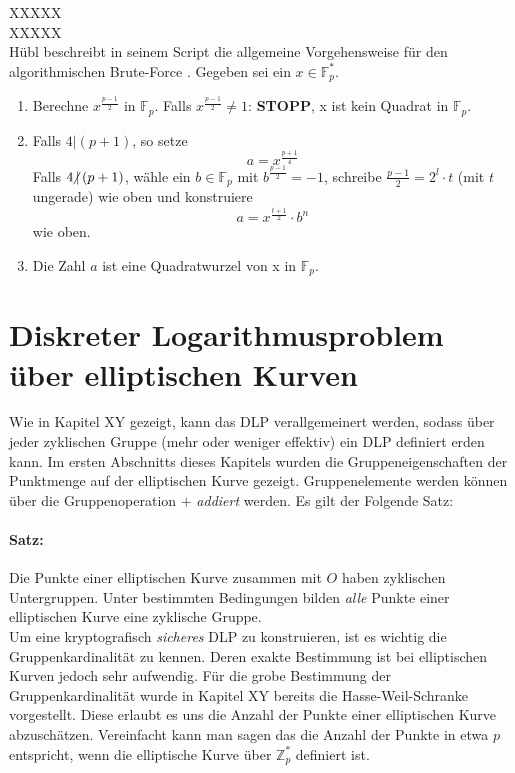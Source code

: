 XXXXX\\

XXXXX\\





Hübl beschreibt in seinem Script die allgemeine Vorgehensweise für den algorithmischen Brute-Force \cite[S. 270-272]{Dr.ReinholdHubl.2022}. Gegeben sei ein $x \in \mathbb{F}_p^*$.

\begin{enumerate}
\item Berechne $x^{\frac{p - 1}{2}}$ in $\mathbb{F}_p$. Falls $x^{\frac{p - 1}{2}} \neq 1$: \textbf{STOPP}, x ist kein Quadrat in $\mathbb{F}_p$.
\item Falls $4 | (p + 1)$, so setze $$a =  x^{\frac{p + 1}{4}}$$ Falls $4 \hspace{-0.4em}\not\hspace{0.025em}|\, (p + 1)$, wähle ein $b \in \mathbb{F}_p$ mit $b^{\frac{p - 1}{2}} = -1$, schreibe $\frac{p - 1}{2} = 2^l \cdot t$ (mit $t$ ungerade) wie oben und konstruiere $$a =  x^{\frac{t + 1}{2}} \cdot b^n$$ wie oben.
\item Die Zahl $a$ ist eine Quadratwurzel von x in $\mathbb{F}_p$.
\end{enumerate}


\section{Diskreter Logarithmusproblem über elliptischen Kurven} \label{sec:DLPüberEC}
Wie in Kapitel XY gezeigt, kann das DLP verallgemeinert werden, sodass über jeder zyklischen Gruppe (mehr oder weniger effektiv) ein DLP definiert erden kann. Im ersten Abschnitts dieses Kapitels wurden die Gruppeneigenschaften der Punktmenge auf der elliptischen Kurve gezeigt. Gruppenelemente werden können über die Gruppenoperation $+$ \textit{addiert} werden. Es gilt der Folgende Satz:

\paragraph{Satz:}
Die Punkte einer elliptischen Kurve zusammen mit $O$ haben zyklischen Untergruppen. Unter bestimmten Bedingungen bilden \textit{alle} Punkte einer elliptischen Kurve eine zyklische Gruppe.\\

Um eine kryptografisch \textit{sicheres} DLP zu konstruieren, ist es wichtig die Gruppenkardinalität zu kennen. Deren exakte Bestimmung ist bei elliptischen Kurven jedoch sehr aufwendig. Für die grobe Bestimmung der Gruppenkardinalität wurde in Kapitel XY bereits die Hasse-Weil-Schranke vorgestellt. Diese erlaubt es uns die Anzahl der Punkte einer elliptischen Kurve abzuschätzen. Vereinfacht kann man sagen das die Anzahl der Punkte in etwa $p$ entspricht, wenn die elliptische Kurve über $\mathbb{Z}^*_p$ definiert ist.\\

